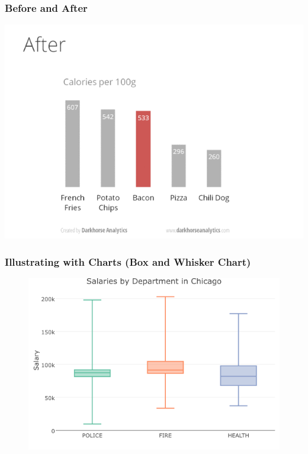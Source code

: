 \documentclass{beamer}
\begin{document}
\begin{frame}
\frametitle{Before and After}
	\includegraphics[width = \textwidth]{./images/designAfter.png}
\end{frame}

\begin{frame}
\frametitle{Illustrating with Charts (Box and Whisker Chart)}
	\begin{figure}
		\includegraphics[scale = 0.5]{./images/chicagoBoxPlot.png}
	\end{figure}
\end{frame}
\end{document}
